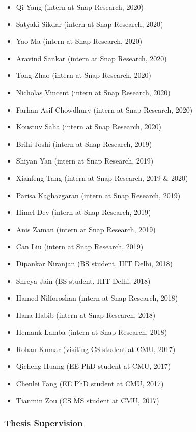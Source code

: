 \documentclass{article}
\begin{document}
\begin{itemize}
\item Qi Yang (intern at Snap Research, 2020)
\item Satyaki Sikdar (intern at Snap Research, 2020)
\item Yao Ma (intern at Snap Research, 2020)
\item Aravind Sankar (intern at Snap Research, 2020)
\item Tong Zhao (intern at Snap Research, 2020)
\item Nicholas Vincent (intern at Snap Research, 2020)
\item Farhan Asif Chowdhury (intern at Snap Research, 2020)
\item Koustuv Saha (intern at Snap Research, 2020)
\item Brihi Joshi (intern at Snap Research, 2019)
\item Shiyan Yan (intern at Snap Research, 2019)
\item Xianfeng Tang (intern at Snap Research, 2019 \& 2020)
\item Parisa Kaghazgaran (intern at Snap Research, 2019)
\item Himel Dev (intern at Snap Research, 2019)
\item Anis Zaman (intern at Snap Research, 2019)
\item Can Liu (intern at Snap Research, 2019)
\item Dipankar Niranjan (BS student, IIIT Delhi, 2018)
\item Shreya Jain (BS student, IIIT Delhi, 2018)
\item Hamed Nilforoshan (intern at Snap Research, 2018)
\item Hana Habib (intern at Snap Research, 2018)
\item Hemank Lamba (intern at Snap Research, 2018)
\item Rohan Kumar (visiting CS student at CMU, 2017)
\item Qicheng Huang (EE PhD student at CMU, 2017)
\item Chenlei Fang (EE PhD student at CMU, 2017)
\item Tianmin Zou (CS MS student at CMU, 2017)
\end{itemize}

\subsubsection*{\bf {Thesis Supervision}}
\end{document}
